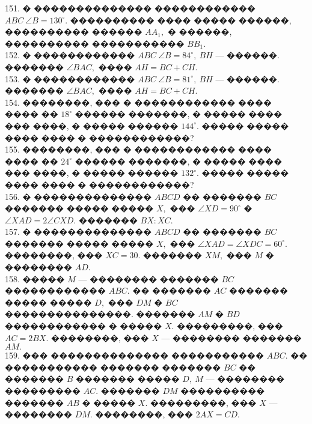 \documentclass[12pt]{article}
\begin{document}
151. � �������������� ������������ $ABC\ \angle B = 130^\circ.$ ���������� ���� ����� ������, ���������� ������ $AA_1,$ � ������, ���������� ����������� $BB_1.$\\
152. � ������������ $ABC\ \angle B = 84^\circ,\ BH$ --- ������. ������� $\angle BAC,$ ���� $AH=BC+CH.$\\
153. � ������������ $ABC\ \angle B = 81^\circ,\ BH$ --- ������. ������� $\angle BAC,$ ���� $AH=BC+CH.$\\
154. ��������, ��� � ������������ ���� ���� �� $18^\circ$ ������ �������, � ����� ���� ��� ����, � ����� ������ $144^\circ.$ ����� ����� ���� ���� � ������������?\\
155. ��������, ��� � ������������ ���� ���� �� $24^\circ$ ������ �������, � ����� ���� ��� ����, � ����� ������ $132^\circ.$ ����� ����� ���� ���� � ������������?\\
156. � �������������� $ABCD$ �� ������� $BC$ ������� ����� ����� $X,$ ��� $\angle XD = 90^\circ$ � $\angle XAD =2\angle CXD.$ ������� $BX : XC.$\\
157. � �������������� $ABCD$ �� ������� $BC$ ������� ����� ����� $X,$ ��� $\angle XAD = \angle XDC = 60^\circ.$ ��������, ��� $XC = 30.$ ������� $XM,$ ��� $M$ � �������� $AD.$\\
158. ����� $M$ --- �������� ������� $BC$ ������������ $ABC.$ �� ������� $AC$ ������� ����� ����� $D,$ ��� $DM$ � $BC$ ���������������. ������� $AM$ � $BD$ ������������ � ����� $X.$ ���������, ���
$AC = 2BX.$ ��������, ��� $X$ --- �������� ������� $AM.$\\
159. ��� �������������� ����������� $ABC.$ �� ����������� ������� ������� $BC$ �� ������� $B$ ������� ����� $D,\ M$ --- �������� ��������� $AC.$
������� $DM$ ���������� ������� $AB$ � ����� $X.$ ���������, ��� $X$ --- �������� $DM.$ ��������, ��� $2AX = CD.$
\newpage
\end{document}

